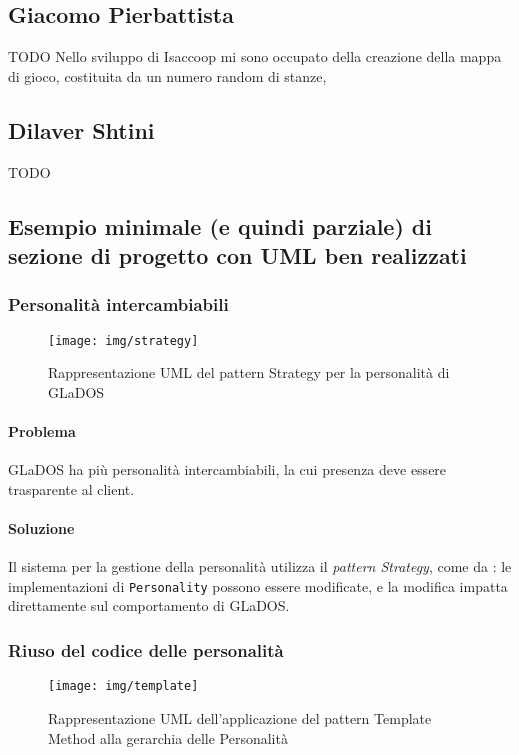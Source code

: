 \documentclass[a4paper,12pt]{report}
\begin{document}
\subsection*{Giacomo Pierbattista}
{TODO}
Nello sviluppo di Isaccoop mi sono occupato della creazione della mappa di gioco, costituita da un numero random di stanze,

\subsection*{Dilaver Shtini}
{TODO}

\subsection*{Esempio minimale (e quindi parziale) di sezione di progetto con UML ben realizzati}

\subsubsection{Personalità intercambiabili}

\begin{figure}[H]
\centering{}
\texttt{[image: img/strategy]}
\caption{Rappresentazione UML del pattern Strategy per la personalità di GLaDOS}
\label{img:strategy}
\end{figure}

\paragraph{Problema} GLaDOS ha più personalità intercambiabili, la cui presenza deve essere trasparente al client.

\paragraph{Soluzione} Il sistema per la gestione della personalità utilizza il \textit{pattern Strategy}, come da
: le implementazioni di \texttt{Personality} possono essere modificate, e la
modifica impatta direttamente sul comportamento di GLaDOS.

\subsubsection{Riuso del codice delle personalità}

\begin{figure}[H]
\centering{}
\texttt{[image: img/template]}
\caption{Rappresentazione UML dell'applicazione del pattern Template Method alla gerarchia delle Personalità}
\label{img:template}
\end{figure}
\end{document}
